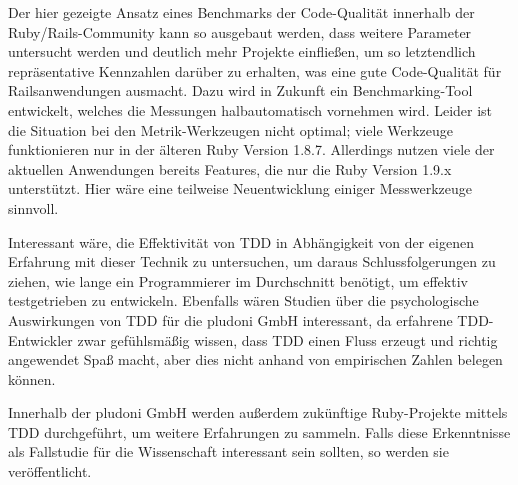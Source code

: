 Der hier gezeigte Ansatz eines Benchmarks der Code-Qualität innerhalb der Ruby/Rails\hyp{}Community kann so ausgebaut werden, dass weitere Parameter untersucht werden und deutlich mehr Projekte einfließen, um so letztendlich repräsentative Kennzahlen darüber zu erhalten, was eine gute Code-Qualität für Railsanwendungen ausmacht. Dazu wird in Zukunft ein Benchmarking\hyp{}Tool entwickelt, welches die Messungen halbautomatisch vornehmen wird. Leider ist die Situation bei den Metrik-Werkzeugen nicht optimal; viele Werkzeuge funktionieren nur in der älteren Ruby Version 1.8.7. Allerdings nutzen viele der aktuellen Anwendungen bereits Features, die nur die Ruby Version 1.9.x unterstützt. Hier wäre eine teilweise Neuentwicklung einiger Messwerkzeuge sinnvoll.

Interessant wäre, die Effektivität von TDD in Abhängigkeit von der eigenen Erfahrung mit dieser Technik zu untersuchen, um daraus Schlussfolgerungen zu ziehen, wie lange ein Programmierer im Durchschnitt benötigt, um effektiv testgetrieben zu entwickeln. Ebenfalls wären Studien über die psychologische Auswirkungen von TDD für die pludoni GmbH interessant, da erfahrene TDD-Entwickler zwar gefühlsmäßig wissen, dass TDD einen Fluss erzeugt und richtig angewendet Spaß macht, aber dies nicht anhand von empirischen Zahlen belegen können.

Innerhalb der pludoni GmbH werden außerdem zukünftige Ruby-Projekte mittels TDD durchgeführt, um weitere Erfahrungen zu sammeln. Falls diese Erkenntnisse als Fallstudie für die Wissenschaft interessant sein sollten, so werden sie veröffentlicht.

